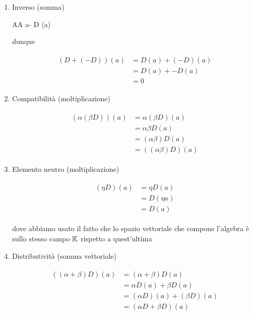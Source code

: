 \begin{enumerate}
	\item Inverso (somma)
	
		{A}{A}
		{a}{- D (a)}
	
	dunque
	
	\begin{align}
		\begin{split}
			(D + (- D)) (a) &= D (a) + (- D) (a)\\
			&= D (a) + - D (a)\\
			&= 0
		\end{split}
	\end{align}
	
	\item Compatibilità (moltiplicazione)
	
	\begin{align}
		\begin{split}
			(\alpha (\beta D)) (a) &= \alpha (\beta D) (a)\\
			&= \alpha \beta D (a)\\
			&= (\alpha \beta) D (a)\\
			&= ((\alpha \beta) D) (a)
		\end{split}
	\end{align}
	
	\item Elemento neutro (moltiplicazione)
	
	\begin{align}
		\begin{split}
			(\eta D) (a) &= \eta D (a)\\
			&= D (\eta a)\\
			&= D (a)
		\end{split}
	\end{align}
	
	dove abbiamo usato il fatto che lo spazio vettoriale che compone l'algebra è sullo stesso campo $ \mathbb{K} $ rispetto a quest'ultima
	
	\item Distributività (somma vettoriale)
	
	\begin{align}
		\begin{split}
			((\alpha + \beta) D) (a) &= (\alpha + \beta) D (a)\\
			&= \alpha D (a) + \beta D (a)\\
			&= (\alpha D) (a) + (\beta D) (a)\\
			&= (\alpha D + \beta D) (a)
		\end{split}
	\end{align}
	

\end{enumerate}
